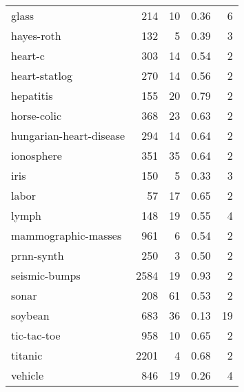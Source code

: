 \documentclass[a4paper,twoside,12pt]{book}
\begin{document}
\begin{table}[!htb]
\begin{tabular}{lrrrr}
glass                   &     214 &         10 &                                   0.36 &          6 \\
hayes-roth              &     132 &          5 &                                   0.39 &          3 \\
heart-c                 &     303 &         14 &                                   0.54 &          2 \\
heart-statlog           &     270 &         14 &                                   0.56 &          2 \\
hepatitis               &     155 &         20 &                                   0.79 &          2 \\
horse-colic             &     368 &         23 &                                   0.63 &          2 \\
hungarian-heart-disease &     294 &         14 &                                   0.64 &          2 \\
ionosphere              &     351 &         35 &                                   0.64 &          2 \\
iris                    &     150 &          5 &                                   0.33 &          3 \\
labor                   &      57 &         17 &                                   0.65 &          2 \\
lymph                   &     148 &         19 &                                   0.55 &          4 \\
mammographic-masses     &     961 &          6 &                                   0.54 &          2 \\
prnn-synth              &     250 &          3 &                                   0.50 &          2 \\
seismic-bumps           &    2584 &         19 &                                   0.93 &          2 \\
sonar                   &     208 &         61 &                                   0.53 &          2 \\
soybean                 &     683 &         36 &                                   0.13 &         19 \\
tic-tac-toe             &     958 &         10 &                                   0.65 &          2 \\
titanic                 &    2201 &          4 &                                   0.68 &          2 \\
vehicle                 &     846 &         19 &                                   0.26 &          4 \\

\end{tabular}
\end{table}
\end{document}
